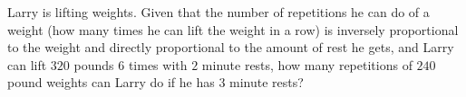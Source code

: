 Larry is lifting weights. Given that the number of repetitions he can do of a weight (how many times he can lift the weight in a row) is inversely proportional to the weight and directly proportional to the amount of rest he gets, and Larry can lift $320$ pounds $6$ times with $2$ minute rests, how many repetitions of $240$ pound weights can Larry do if he has $3$ minute rests?
